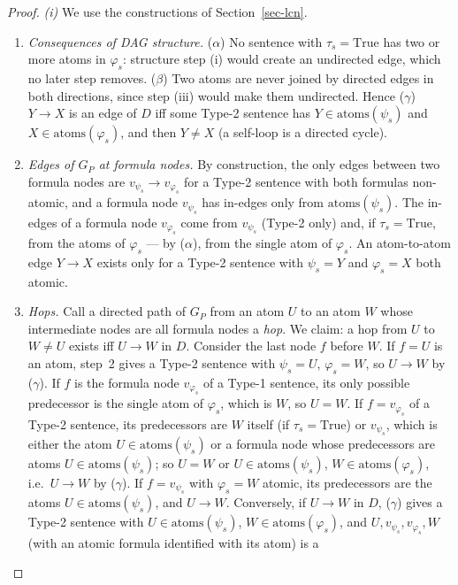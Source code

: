 \documentclass{article} %
\DeclareRobustCommand{\rev}[1]{{\color{blue}#1}}
\newcommand{\atoms}{\mathrm{atoms}}
\begin{document}
\begin{proof}
\emph{(i)} We use the constructions of Section~\ref{sec-lcn}.
\begin{enumerate}
  \item \emph{Consequences of DAG structure.} ($\alpha$) No sentence with
  $\tau_s=\mathrm{True}$ has two or more atoms in $\varphi_s$: structure step (i)
  would create an undirected edge, which no later step removes. ($\beta$) Two
  atoms are never joined by directed edges in both directions, since step (iii)
  would make them undirected. Hence ($\gamma$) $Y\to X$ is an edge of $D$ iff
  some Type-2 sentence has $Y\in\atoms(\psi_s)$ and $X\in\atoms(\varphi_s)$, and
  then $Y\neq X$ (a self-loop is a directed cycle).
  \item \emph{Edges of $G_P$ at formula nodes.} By construction, the only edges
  between two formula nodes are \rev{$v_{\psi_s}\to v_{\varphi_s}$} for a Type-2 sentence with
  both formulas non-atomic, and a formula node \rev{$v_{\psi_s}$} has in-edges only from
  $\atoms(\psi_s)$. The in-edges of a formula node \rev{$v_{\varphi_s}$} come from
  \rev{$v_{\psi_s}$} (Type-2 only) and, if $\tau_s=\mathrm{True}$, from the atoms of
  $\varphi_s$ --- by ($\alpha$), from the single atom of $\varphi_s$. An
  atom-to-atom edge $Y\to X$ exists only for a Type-2 sentence with
  $\psi_s=Y$ and $\varphi_s=X$ both atomic.
  \item \emph{Hops.} Call a directed path of $G_P$ from an atom $U$ to an atom
  $W$ whose intermediate nodes are all formula nodes a \emph{hop}. We claim: a
  hop from $U$ to $W\neq U$ exists iff $U\to W$ in $D$. Consider the last node
  $f$ before $W$. If $f=U$ is an atom, step~2 gives a Type-2 sentence with
  $\psi_s=U$, $\varphi_s=W$, so $U\to W$ by ($\gamma$). If $f$ is the formula node
  \rev{$v_{\varphi_s}$} of a Type-1 sentence, its only possible predecessor is the single
  atom of $\varphi_s$, which is $W$, so $U=W$. If \rev{$f=v_{\varphi_s}$} of a Type-2
  sentence, its predecessors are $W$ itself (if $\tau_s=\mathrm{True}$) or
  \rev{$v_{\psi_s}$}, which is either the atom $U\in\atoms(\psi_s)$ or a formula node whose
  predecessors are atoms $U\in\atoms(\psi_s)$; so $U=W$ or
  $U\in\atoms(\psi_s)$, $W\in\atoms(\varphi_s)$, i.e.\ $U\to W$ by ($\gamma$). If
  \rev{$f=v_{\psi_s}$} with $\varphi_s=W$ atomic, its predecessors are the atoms
  $U\in\atoms(\psi_s)$, and $U\to W$. Conversely, if $U\to W$ in $D$, ($\gamma$)
  gives a Type-2 sentence with $U\in\atoms(\psi_s)$, $W\in\atoms(\varphi_s)$, and
  \rev{$U,v_{\psi_s},v_{\varphi_s},W$} (with an atomic formula identified with its atom) is a

\end{enumerate}
\end{proof}
\end{document}
